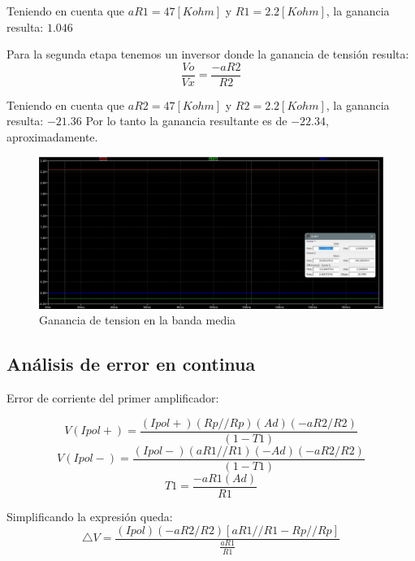 \documentclass[12pt]{article}
\begin{document}
	Teniendo en cuenta que $aR1=47[Kohm]$ y $R1=2.2[Kohm]$, la ganancia resulta: $1.046$
	
	Para la segunda etapa tenemos un inversor donde la ganancia de tensión resulta:
	\begin{equation}
		\frac{Vo}{Vx}= \frac{-aR2}{R2}
	\end{equation}
	
	Teniendo en cuenta que $aR2=47[Kohm]$ y $R2=2.2[Kohm]$, la ganancia resulta: $-21.36$
	Por lo tanto la ganancia resultante es de $-22.34$, aproximadamente.
	
	\begin{figure}
		\includegraphics[width=\linewidth]{Imagenes_simulaciones/Sim_Ganancia_C2}
		\caption[Ganancia de tensión en la banda media]{Ganancia de tension en la banda media}
		\label{fig:simgananciac2}
	\end{figure}
	
	\subsection{Análisis de error en continua}
	Error de corriente del primer amplificador:
	
	\begin{equation}
		V(Ipol+)=\frac{(Ipol+)(Rp//Rp)(Ad)(-aR2/R2)}{(1-T1)}
	\end{equation}
	\begin{equation}
		V(Ipol-)=\frac{(Ipol-)(aR1//R1)(-Ad)(-aR2/R2)}{(1-T1)}
	\end{equation}
	\begin{equation}
		T1=\frac{-aR1(Ad)}{R1}
	\end{equation}
	
	Simplificando la expresión queda:
	\begin{equation}
		\bigtriangleup V= \frac{(Ipol)(-aR2/R2)[aR1//R1-Rp//Rp]}{\frac{aR1}{R1}}
	\end{equation}
	
\end{document}
